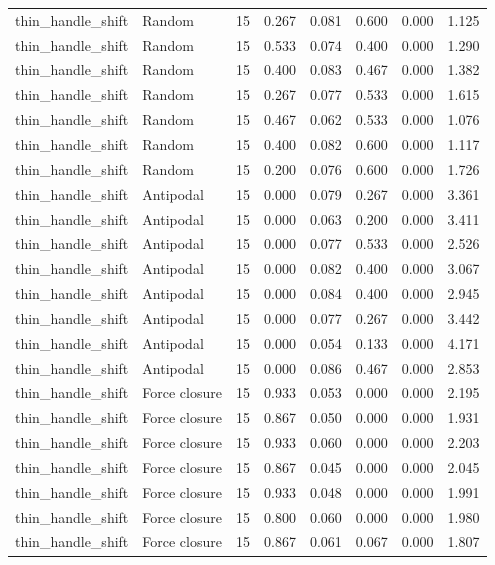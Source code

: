 {\begin{longtable}{llrrrrrr}
thin\_handle\_shift & Random & 15 & 0.267 & 0.081 & 0.600 & 0.000 & 1.125 \\
thin\_handle\_shift & Random & 15 & 0.533 & 0.074 & 0.400 & 0.000 & 1.290 \\
thin\_handle\_shift & Random & 15 & 0.400 & 0.083 & 0.467 & 0.000 & 1.382 \\
thin\_handle\_shift & Random & 15 & 0.267 & 0.077 & 0.533 & 0.000 & 1.615 \\
thin\_handle\_shift & Random & 15 & 0.467 & 0.062 & 0.533 & 0.000 & 1.076 \\
thin\_handle\_shift & Random & 15 & 0.400 & 0.082 & 0.600 & 0.000 & 1.117 \\
thin\_handle\_shift & Random & 15 & 0.200 & 0.076 & 0.600 & 0.000 & 1.726 \\
thin\_handle\_shift & Antipodal & 15 & 0.000 & 0.079 & 0.267 & 0.000 & 3.361 \\
thin\_handle\_shift & Antipodal & 15 & 0.000 & 0.063 & 0.200 & 0.000 & 3.411 \\
thin\_handle\_shift & Antipodal & 15 & 0.000 & 0.077 & 0.533 & 0.000 & 2.526 \\
thin\_handle\_shift & Antipodal & 15 & 0.000 & 0.082 & 0.400 & 0.000 & 3.067 \\
thin\_handle\_shift & Antipodal & 15 & 0.000 & 0.084 & 0.400 & 0.000 & 2.945 \\
thin\_handle\_shift & Antipodal & 15 & 0.000 & 0.077 & 0.267 & 0.000 & 3.442 \\
thin\_handle\_shift & Antipodal & 15 & 0.000 & 0.054 & 0.133 & 0.000 & 4.171 \\
thin\_handle\_shift & Antipodal & 15 & 0.000 & 0.086 & 0.467 & 0.000 & 2.853 \\
thin\_handle\_shift & Force closure & 15 & 0.933 & 0.053 & 0.000 & 0.000 & 2.195 \\
thin\_handle\_shift & Force closure & 15 & 0.867 & 0.050 & 0.000 & 0.000 & 1.931 \\
thin\_handle\_shift & Force closure & 15 & 0.933 & 0.060 & 0.000 & 0.000 & 2.203 \\
thin\_handle\_shift & Force closure & 15 & 0.867 & 0.045 & 0.000 & 0.000 & 2.045 \\
thin\_handle\_shift & Force closure & 15 & 0.933 & 0.048 & 0.000 & 0.000 & 1.991 \\
thin\_handle\_shift & Force closure & 15 & 0.800 & 0.060 & 0.000 & 0.000 & 1.980 \\
thin\_handle\_shift & Force closure & 15 & 0.867 & 0.061 & 0.067 & 0.000 & 1.807 \\

\end{longtable}}
